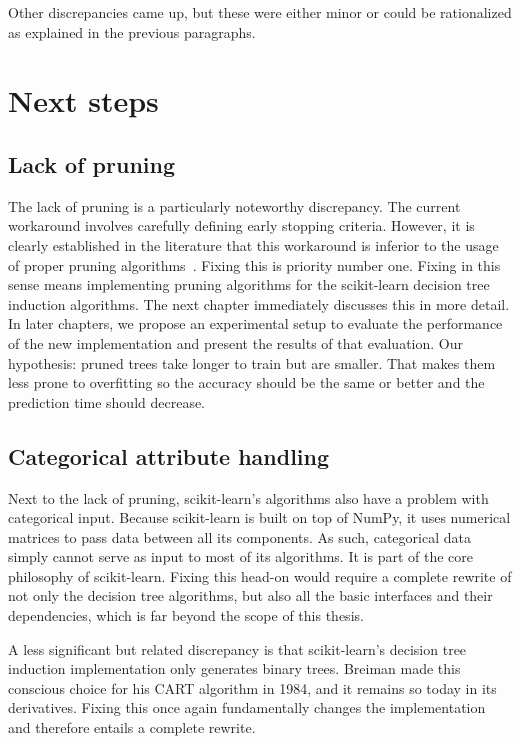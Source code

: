 Other discrepancies came up, but these were either minor or could be rationalized as explained in the previous paragraphs.

\section{Next steps}

\subsection{Lack of pruning}
The lack of pruning is a particularly noteworthy discrepancy. The current workaround involves carefully defining early stopping criteria. However, it is clearly established in the literature that this workaround is inferior to the usage of proper pruning algorithms~\cite{cart, c45}. Fixing this is priority number one. Fixing in this sense means implementing pruning algorithms for the scikit-learn decision tree induction algorithms. The next chapter immediately discusses this in more detail. In later chapters, we propose an experimental setup to evaluate the performance of the new implementation and present the results of that evaluation. Our hypothesis: pruned trees take longer to train but are smaller. That makes them less prone to overfitting so the accuracy should be the same or better and the prediction time should decrease.

\subsection{Categorical attribute handling}
Next to the lack of pruning, scikit-learn's algorithms also have a problem with categorical input. Because scikit-learn is built on top of NumPy, it uses numerical matrices to pass data between all its components. As such, categorical data simply cannot serve as input to most of its algorithms. It is part of the core philosophy of scikit-learn. Fixing this head-on would require a complete rewrite of not only the decision tree algorithms, but also all the basic interfaces and their dependencies, which is far beyond the scope of this thesis.

A less significant but related discrepancy is that scikit-learn's decision tree induction implementation only generates binary trees. Breiman made this conscious choice for his CART algorithm in 1984, and it remains so today in its derivatives. Fixing this once again fundamentally changes the implementation and therefore entails a complete rewrite.

